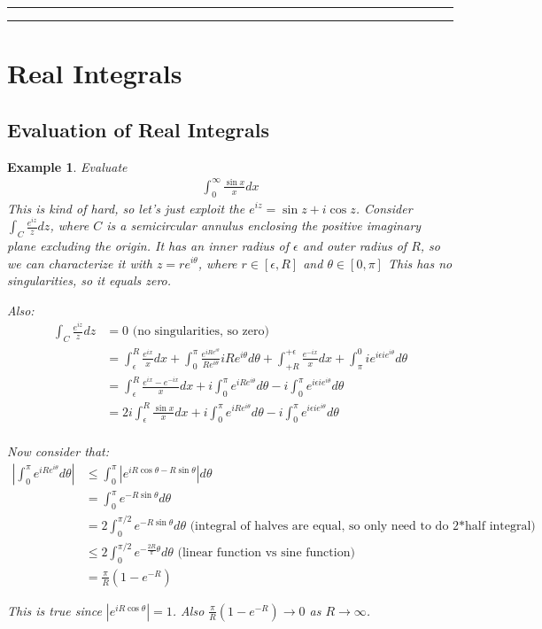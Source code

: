 \documentclass{article}
\newtheorem{ex}{Example}
\theoremstyle{definition}
\newcommand{\Section}[1]{\hrule\hrule\section{#1}}
\begin{document}
\Section{Real Integrals}
\subsection{Evaluation of Real Integrals}
\begin{ex}
Evaluate 
\begin{align}
\int_0^\infty \frac{\sin x}{x} dx 
\end{align}
This is kind of hard, so let's just exploit the $e^{iz} = \sin z + i \cos z$. 
Consider $\int_C \frac{e^{iz}}{z} dz$, where $C$ is a semicircular annulus enclosing the positive imaginary plane excluding the origin. It has an inner radius of $\epsilon$ and outer radius of $R$, so we can characterize it with $z=re^{i\theta}$, where $r \in [\epsilon, R]$ and $\theta \in [0, \pi]$ This has no singularities, so it equals zero. 

Also:
\begin{align}
\int_C \frac{e^{iz}}{z} dz & = 0 \text{ (no singularities, so zero)}\\ 
&= \int_{\epsilon}^R \frac{e^{ix}}{x}dx + \int_0^\pi \frac{e^{iRe^{i\theta}}}{Re^{i\theta}} iRe^{i\theta} d\theta + \int_{+R}^{+\epsilon}\frac{e^{-ix}}{x}dx + \int_{\pi}^{0} ie^{i\epsilon i e^{i\theta}} d\theta \\ 
&= \int_{\epsilon}^{R} \frac{e^{ix}-e^{-ix}}{x}dx + i \int_{0}^{\pi} e^{iRe^{i\theta}} d\theta - i \int_{0}^{\pi}e^{i\epsilon i e^{i\theta}} d\theta \\ 
&= 2 i \int_{\epsilon}^{R} \frac{\sin x}{x}dx + i \int_{0}^{\pi} e^{iRe^{i\theta}} d\theta - i \int_{0}^{\pi}e^{i\epsilon i e^{i\theta}} d\theta \\ 
\end{align}

Now consider that:
\begin{align}
\left|\int_{0}^\pi e^{iRe^{i\theta}} d\theta \right| &\leq \int_{0}^\pi \left|e^{iR \cos \theta - R \sin \theta } \right|d\theta \\ 
& = \int_{0}^\pi e^{-R\sin\theta} d\theta  \\ 
& = 2 \int_{0}^{\pi/2} e^{-R\sin\theta} d\theta \text{ (integral of halves are equal, so only need to do 2*half integral)}\\ 
& \leq  2 \int_{0}^{\pi/2} e^{-\frac{2R}{\pi}\theta} d\theta \text{ (linear function vs sine function)} \\ 
& = \frac{\pi }{R}(1-e^{-R}) 
\end{align}

This is true since $|e^{iR \cos \theta}| = 1$. Also $\frac{\pi }{R}(1-e^{-R}) \to 0$ as $R \to \infty$.


\end{ex}
\end{document}
